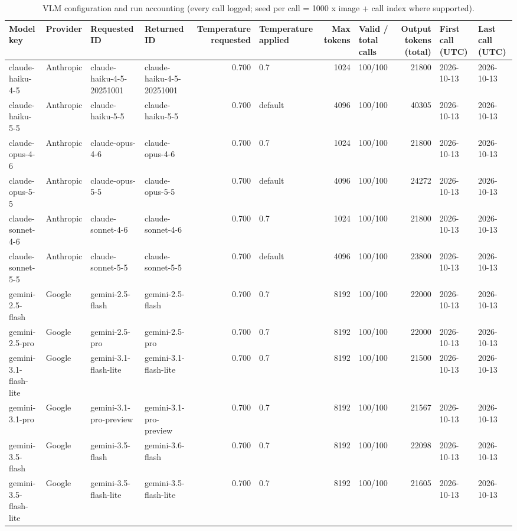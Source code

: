 \begin{table}
\caption{VLM configuration and run accounting (every call logged; seed per call = 1000 x image + call index where supported).}
\begin{tabular}{llllrlrlrll}
\toprule
Model key & Provider & Requested ID & Returned ID & Temperature requested & Temperature applied & Max tokens & Valid / total calls & Output tokens (total) & First call (UTC) & Last call (UTC) \\
\midrule
claude-haiku-4-5 & Anthropic & claude-haiku-4-5-20251001 & claude-haiku-4-5-20251001 & 0.700 & 0.7 & 1024 & 100/100 & 21800 & 2026-10-13 & 2026-10-13 \\
claude-haiku-5-5 & Anthropic & claude-haiku-5-5 & claude-haiku-5-5 & 0.700 & default & 4096 & 100/100 & 40305 & 2026-10-13 & 2026-10-13 \\
claude-opus-4-6 & Anthropic & claude-opus-4-6 & claude-opus-4-6 & 0.700 & 0.7 & 1024 & 100/100 & 21800 & 2026-10-13 & 2026-10-13 \\
claude-opus-5-5 & Anthropic & claude-opus-5-5 & claude-opus-5-5 & 0.700 & default & 4096 & 100/100 & 24272 & 2026-10-13 & 2026-10-13 \\
claude-sonnet-4-6 & Anthropic & claude-sonnet-4-6 & claude-sonnet-4-6 & 0.700 & 0.7 & 1024 & 100/100 & 21800 & 2026-10-13 & 2026-10-13 \\
claude-sonnet-5-5 & Anthropic & claude-sonnet-5-5 & claude-sonnet-5-5 & 0.700 & default & 4096 & 100/100 & 23800 & 2026-10-13 & 2026-10-13 \\
gemini-2.5-flash & Google & gemini-2.5-flash & gemini-2.5-flash & 0.700 & 0.7 & 8192 & 100/100 & 22000 & 2026-10-13 & 2026-10-13 \\
gemini-2.5-pro & Google & gemini-2.5-pro & gemini-2.5-pro & 0.700 & 0.7 & 8192 & 100/100 & 22000 & 2026-10-13 & 2026-10-13 \\
gemini-3.1-flash-lite & Google & gemini-3.1-flash-lite & gemini-3.1-flash-lite & 0.700 & 0.7 & 8192 & 100/100 & 21500 & 2026-10-13 & 2026-10-13 \\
gemini-3.1-pro & Google & gemini-3.1-pro-preview & gemini-3.1-pro-preview & 0.700 & 0.7 & 8192 & 100/100 & 21567 & 2026-10-13 & 2026-10-13 \\
gemini-3.5-flash & Google & gemini-3.5-flash & gemini-3.6-flash & 0.700 & 0.7 & 8192 & 100/100 & 22098 & 2026-10-13 & 2026-10-13 \\
gemini-3.5-flash-lite & Google & gemini-3.5-flash-lite & gemini-3.5-flash-lite & 0.700 & 0.7 & 8192 & 100/100 & 21605 & 2026-10-13 & 2026-10-13 \\

\end{tabular}
\end{table}
